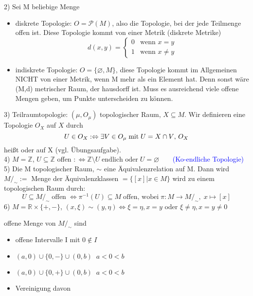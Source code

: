 \documentclass[fleqn, 12pt, letterpaper]{article}
\newcommand{\txt}[1]{\text{#1}}
\begin{document}
2) Sei M beliebige Menge\begin{itemize}
	\item diskrete Topologie: $O=\mathcal{P}(M)$, also die Topologie, bei der jede Teilmenge offen ist. Diese Topologie kommt von einer Metrik (diskrete Metrike)
	\[
  d(x, y) = \begin{cases}
  0 & \text{wenn } x = y \\
  1 & \text{wenn } x \ne y
  \end{cases}
  \]
	\item indiskrete Topologie: $O=\{\varnothing ,M\}$, diese Topologie kommt im Allgemeinen NICHT von einer Metrik, wenn M mehr als ein Element hat. Denn sonst wäre (M,d) metrischer Raum, der hausdorff ist. Muss es ausreichend viele offene Mengen geben, um Punkte unterscheiden zu können.
\end{itemize}

3) Teilraumtopologie: $(\mu, O_{\mu})$ topologischer Raum, $X\subseteq M$. Wir definieren eine Topologie $O_X$ auf $X$ durch 
\begin{equation*}
	U\in O_X :\Leftrightarrow \exists V\in O_{\mu} \;\text{mit}\; U=X\cap V $, $O_X
\end{equation*}
heißt  oder  auf X (vgl. Übungsaufgabe).\\

4) $M=\mathbb{Z} $, $U\subseteq \mathbb{Z}$ offen $:\Leftrightarrow \mathbb{Z}\setminus U \;\txt{endlich oder}\;U=\varnothing \qquad $\textcolor{blue}{(Ko-endliche Topologie)} \\

5) Die  M topologischer Raum, $\sim$ eine Äquivalenzrelation auf M. Dann wird $M/_{\sim}:=$ Menge der Äquivalenzklassen $=\{[x]|x\in M\}$ wird zu einem topologischen Raum durch: 
\begin{equation*}
	U\subseteq M/_{\sim} \; \txt{offen}\; \Leftrightarrow  \pi^{-1}(U)\subseteq M \;\txt{offen, wobei}\; \pi:M\rightarrow M/_{\sim}, \;x\mapsto [x]
\end{equation*}
6) $M=\mathbb{R}\times \{+,-\}$, $(x, \xi )\sim (y, \eta)\Leftrightarrow \xi = \eta, x=y$ oder $\xi\neq \eta, x=y\neq 0$

offene Menge von $M/_{\sim}$ sind\begin{itemize}
	\item offene Intervalle I mit $0\notin I$
	\item $(a, 0)\cup \{0,-\} \cup (0, b)\; \; a<0<b$
	\item $(a, 0)\cup \{0,+\} \cup (0, b)\; \; a<0<b$
	\item Vereinigung davon
\end{itemize}
\end{document}
